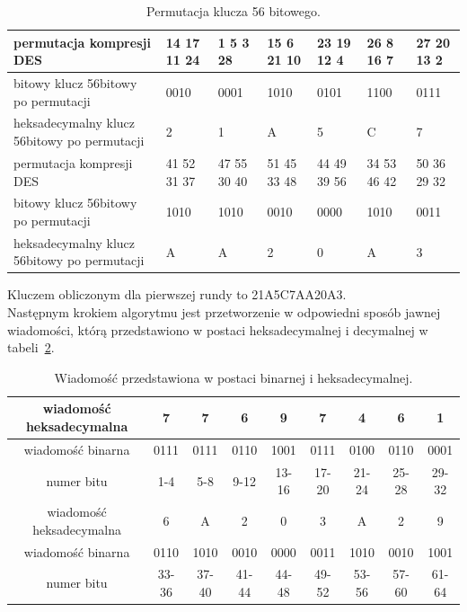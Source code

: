 \documentclass[12p]{article}
\begin{document}
\begin{table}[H]
\centering
\begin{tabular}{ | p{3cm} | p{1.7cm} | p{1.7cm} | p{1.7cm} | p{1.7cm} | p{1.7cm} | p{1.7cm} |}
\hline
permutacja kompresji DES & 14 17 11 24  & 1 5 3 28 &  15 6 21 10 & 23  19 12 4 & 26 8 16 7 & 27 20 13 2\\ \hline
bitowy klucz 56bitowy po permutacji & 0010 & 0001 & 1010 & 0101 & 1100 & 0111 \\ \hline
heksadecymalny klucz 56bitowy po permutacji & 2 & 1 & A & 5 & C & 7\\
\hline \hline
permutacja kompresji DES & 41 52 31 37 & 47 55 30 40 & 51 45 33 48 & 44 49 39 56 & 34 53 46 42 & 50 36 29 32\\ \hline
bitowy klucz 56bitowy po permutacji & 1010 & 1010 & 0010 & 0000 & 1010 & 0011\\ \hline
heksadecymalny klucz 56bitowy po permutacji & A & A & 2 & 0 & A & 3\\ 
\hline
\end{tabular}
\caption{Permutacja klucza 56 bitowego.}\label{56}
\end{table}

Kluczem obliczonym dla pierwszej rundy to 21A5C7AA20A3.\\


Następnym krokiem algorytmu jest przetworzenie w odpowiedni sposób jawnej wiadomości, którą przedstawiono w postaci heksadecymalnej i decymalnej w tabeli~\ref{wiadomosc}.

\begin{table}[H]
\centering
\begin{tabular}{|c|c|c|c|c|c|c|c|c|}
\hline
wiadomość heksadecymalna & 7 & 7 & 6 & 9 & 7 & 4 & 6 & 1\\ \hline
wiadomość binarna & 0111 & 0111 & 0110 & 1001 & 0111 & 0100 & 0110 & 0001\\ \hline
numer bitu & 1-4 & 5-8 & 9-12 & 13-16 & 17-20 & 21-24 & 25-28 & 29-32\\ \hline
wiadomość heksadecymalna & 6 & A & 2 & 0 & 3 & A & 2 & 9\\ \hline
wiadomość binarna & 0110 & 1010 & 0010 & 0000 & 0011 & 1010 & 0010 & 1001\\ \hline
numer bitu & 33-36 & 37-40 & 41-44 & 44-48 & 49-52 & 53-56 & 57-60 & 61-64\\ \hline
\end{tabular}
\caption{Wiadomość przedstawiona w postaci binarnej i heksadecymalnej.}\label{wiadomosc}
\end{table}
\end{document}
